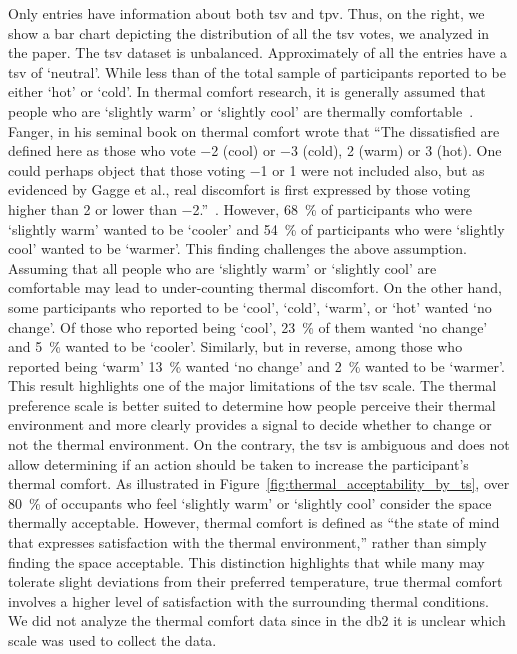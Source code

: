 Only  entries have information about both \ac{tsv} and \ac{tpv}.
Thus, on the right, we show a bar chart depicting the distribution of all the \ac{tsv} votes, we analyzed in the paper.
The \ac{tsv} dataset is unbalanced.
Approximately  of all the entries have a \ac{tsv} of `neutral'.
While less than  of the total sample of participants reported to be either `hot' or `cold'.
In thermal comfort research, it is generally assumed that people who are `slightly warm' or `slightly cool' are thermally comfortable~\cite{Fanger1970, schweiker2020evaluating}.
Fanger, in his seminal book on thermal comfort wrote that ``The dissatisfied are defined here as those who vote \num{-2} (cool) or \num{-3} (cold), \num{2} (warm) or \num{3} (hot).
One could perhaps object that those voting \num{-1} or \num{1} were not included also, but as evidenced by Gagge et al., real discomfort is first expressed by those voting higher than \num{2} or lower than \num{-2}.''~\cite{Fanger1970}.
However, \qty{68}{\percent} of participants who were `slightly warm' wanted to be `cooler' and \qty{54}{\percent} of participants who were `slightly cool' wanted to be `warmer'.
This finding challenges the above assumption.
Assuming that all people who are `slightly warm' or `slightly cool' are comfortable may lead to under-counting thermal discomfort.
On the other hand, some participants who reported to be `cool', `cold', `warm', or `hot' wanted `no change'.
Of those who reported being `cool', \qty{23}{\percent} of them wanted `no change' and \qty{5}{\percent} wanted to be `cooler'.
Similarly, but in reverse, among those who reported being `warm' \qty{13}{\percent} wanted `no change' and \qty{2}{\percent} wanted to be `warmer'.
This result highlights one of the major limitations of the \ac{tsv} scale.
The thermal preference scale is better suited to determine how people perceive their thermal environment and more clearly provides a signal to decide whether to change or not the thermal environment.
On the contrary, the \ac{tsv} is ambiguous and does not allow determining if an action should be taken to increase the participant's thermal comfort.
As illustrated in Figure~\ref{fig:thermal_acceptability_by_ts}, over \qty{80}{\percent} of occupants who feel `slightly warm' or `slightly cool' consider the space thermally acceptable.
However, thermal comfort is defined as ``the state of mind that expresses satisfaction with the thermal environment,'' rather than simply finding the space acceptable. 
This distinction highlights that while many may tolerate slight deviations from their preferred temperature, true thermal comfort involves a higher level of satisfaction with the surrounding thermal conditions.
We did not analyze the thermal comfort data since in the \ac{db2} it is unclear which scale was used to collect the data.

